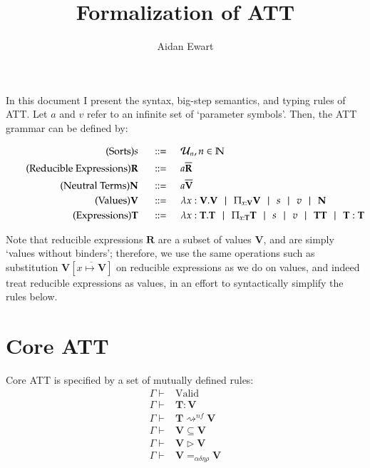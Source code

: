 \documentclass{article}
\author{Aidan Ewart}
\title{Formalization of ATT}
\newcommand{\set}{\mathcal{U}}
\newcommand{\nat}{\mathbb{N}}
\newcommand{\fun}[2]{\lambda #1. #2}
\newcommand{\for}[2]{\Pi_{#1}#2}
\newcommand{\bnfdef}{\hspace{0.5cm} ::= \hspace{0.5cm}}
\newcommand{\alt}{\hspace{0.25cm} | \hspace{0.25cm}}
\newcommand{\bb}{\mathbf}
\newcommand{\evals}{\rightsquigarrow^{nf}}
\begin{document}
\maketitle
In this document I present the syntax, big-step semantics, and typing rules of ATT. Let $a$ and $v$ refer to an infinite set of `parameter symbols'. Then, the ATT grammar can be defined by:

\begin{align*}
    \tag{Sorts}
    s \bnfdef& \set_n, n \in \nat
    \\ \tag{Reducible Expressions}
    \bb{R} \bnfdef& a \overline{\bb{R}}
    \\ \tag{Neutral Terms}
    \bb{N} \bnfdef& a \overline{\bb{V}}
    \\ \tag{Values}
    \bb{V} \bnfdef& \fun{x: \bb{V}} \bb{V} \alt \for{x: \bb{V}} \bb{V} \alt s \alt v \alt \bb{N}
    \\ \tag{Expressions}
    \bb{T} \bnfdef& \fun{x:\bb{T}}{\bb{T}} \alt \for{x : \bb{T}} \bb{T} \alt s \alt v \alt \bb{T T} \alt \bb{T} : \bb{T}
\end{align*}

Note that reducible expressions $\bb{R}$ are a subset of values $\bb{V}$, and are simply `values without binders'; therefore, we use the same operations such as substitution $\bb{V}[\overline{x \mapsto \bb{V}}]$ on reducible expressions as we do on values, and indeed treat reducible expressions as values, in an effort to syntactically simplify the rules below.

\section{Core ATT}

Core ATT is specified by a set of mutually defined rules:
\begin{align*}
    \tag{Context Validity}
    \Gamma \vdash& \mathrm{Valid}
    \\ \tag{Typing}
    \Gamma \vdash& \bb{T} : \bb{V}
    \\ \tag{Evaluation}
    \Gamma \vdash& \bb{T} \evals \bb{V}
    \\ \tag{Subtyping}
    \Gamma \vdash& \bb{V} \subseteq \bb{V}
    \\ \tag{Conversion}
    \Gamma \vdash& \bb{V} \triangleright \bb{V}
    \\ \tag{Equivalence}
    \Gamma \vdash& \bb{V} =_{\alpha \delta \eta \rho} \bb{V}
\end{align*}
\end{document}

